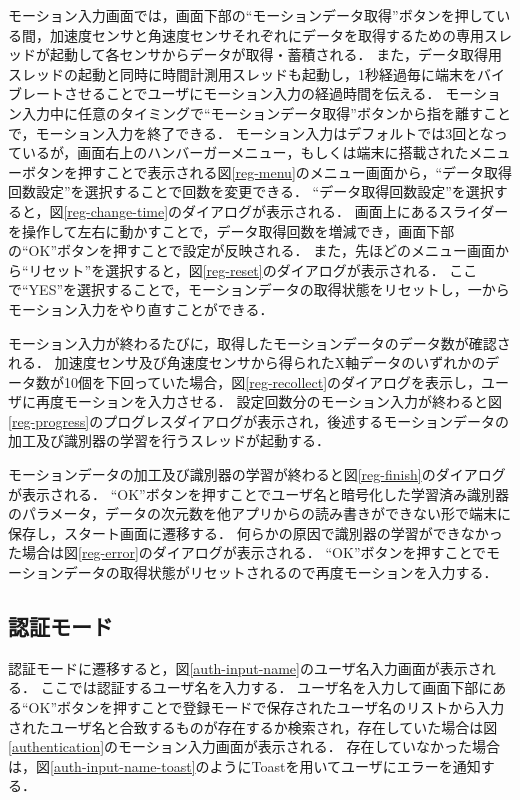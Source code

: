 モーション入力画面では，画面下部の``モーションデータ取得''ボタンを押している間，加速度センサと角速度センサそれぞれにデータを取得するための専用スレッドが起動して各センサからデータが取得・蓄積される．
また，データ取得用スレッドの起動と同時に時間計測用スレッドも起動し，1秒経過毎に端末をバイブレートさせることでユーザにモーション入力の経過時間を伝える．
モーション入力中に任意のタイミングで``モーションデータ取得''ボタンから指を離すことで，モーション入力を終了できる．
モーション入力はデフォルトでは3回となっているが，画面右上のハンバーガーメニュー，もしくは端末に搭載されたメニューボタンを押すことで表示される図\ref{reg-menu}のメニュー画面から，``データ取得回数設定''を選択することで回数を変更できる．
``データ取得回数設定''を選択すると，図\ref{reg-change-time}のダイアログが表示される．
画面上にあるスライダーを操作して左右に動かすことで，データ取得回数を増減でき，画面下部の``OK''ボタンを押すことで設定が反映される．
また，先ほどのメニュー画面から``リセット''を選択すると，図\ref{reg-reset}のダイアログが表示される．
ここで``YES''を選択することで，モーションデータの取得状態をリセットし，一からモーション入力をやり直すことができる．

モーション入力が終わるたびに，取得したモーションデータのデータ数が確認される．
加速度センサ及び角速度センサから得られたX軸データのいずれかのデータ数が10個を下回っていた場合，図\ref{reg-recollect}のダイアログを表示し，ユーザに再度モーションを入力させる．
設定回数分のモーション入力が終わると図\ref{reg-progress}のプログレスダイアログが表示され，後述するモーションデータの加工及び識別器の学習を行うスレッドが起動する．

モーションデータの加工及び識別器の学習が終わると図\ref{reg-finish}のダイアログが表示される．
``OK''ボタンを押すことでユーザ名と暗号化した学習済み識別器のパラメータ，データの次元数を他アプリからの読み書きができない形で端末に保存し，スタート画面に遷移する．
何らかの原因で識別器の学習ができなかった場合は図\ref{reg-error}のダイアログが表示される．
``OK''ボタンを押すことでモーションデータの取得状態がリセットされるので再度モーションを入力する．

\subsection{認証モード}
認証モードに遷移すると，図\ref{auth-input-name}のユーザ名入力画面が表示される．
ここでは認証するユーザ名を入力する．
ユーザ名を入力して画面下部にある``OK''ボタンを押すことで登録モードで保存されたユーザ名のリストから入力されたユーザ名と合致するものが存在するか検索され，存在していた場合は図\ref{authentication}のモーション入力画面が表示される．
存在していなかった場合は，図\ref{auth-input-name-toast}のようにToastを用いてユーザにエラーを通知する．

